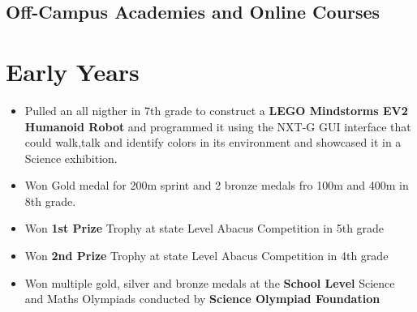 \documentclass[11pt,a4paper,sans]{moderncv} %
\begin{document}
    \subsection{Off-Campus Academies and Online Courses}


\section{Early Years}
\begin{itemize}
    \item Pulled an all nigther in 7th grade to construct a \textbf{LEGO Mindstorms EV2 
    Humanoid Robot} and programmed it using the NXT-G GUI interface that could walk,talk 
    and identify colors in its environment and showcased it in a Science exhibition.
    \item Won Gold medal for 200m sprint and 2 bronze medals fro 100m and 400m in 8th grade.
    \item Won \textbf{1st Prize} Trophy at state Level Abacus Competition in 5th grade
    \item Won \textbf{2nd Prize} Trophy at state Level Abacus Competition in 4th grade     
    \item Won multiple gold, silver and bronze medals at the \textbf{School Level}  Science 
    and Maths Olympiads conducted by \textbf{Science Olympiad Foundation}            
\end{itemize}
\end{document}
